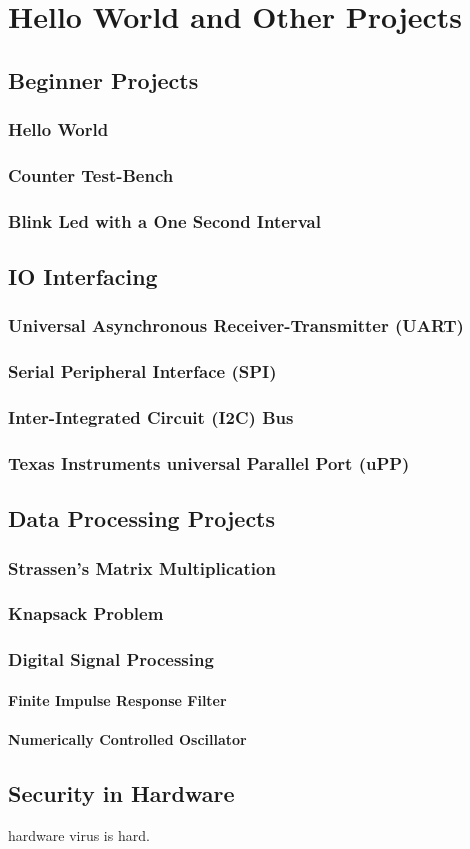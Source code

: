 \chapter{Hello World and Other Projects}
\section{Beginner Projects}
\subsection{Hello World}
\subsection{Counter Test-Bench}
\subsection{Blink Led with a One Second Interval}


\section{IO Interfacing}
\subsection{Universal Asynchronous Receiver-Transmitter (UART)}
\subsection{Serial Peripheral Interface (SPI)}
\subsection{Inter-Integrated Circuit (I2C) Bus}
\subsection{Texas Instruments universal Parallel Port (uPP)}

\section{Data Processing Projects}
\subsection{Strassen's Matrix Multiplication}
\subsection{Knapsack Problem}

\subsection{Digital Signal Processing}
\subsubsection{Finite Impulse Response Filter}
\subsubsection{Numerically Controlled Oscillator}



\section{Security in Hardware}
hardware virus is hard. 